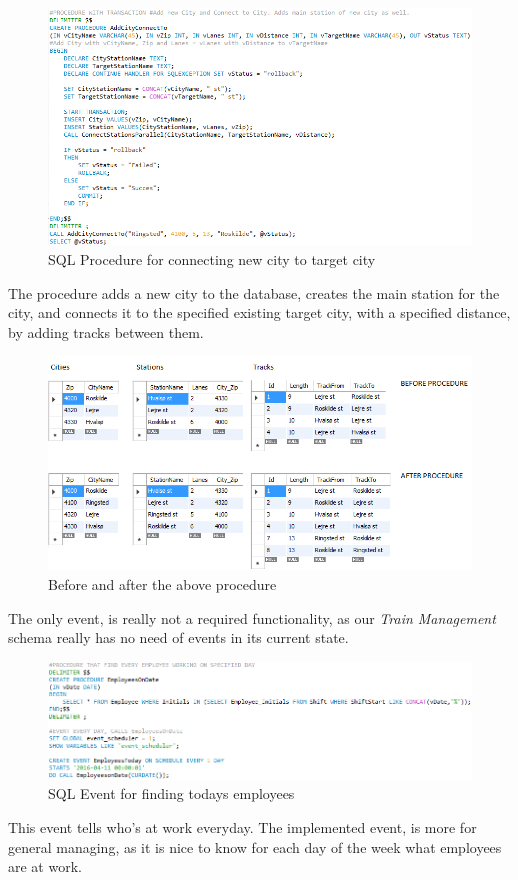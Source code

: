 \begin{figure}[ht!]
    \centering
    \includegraphics[width=1\textwidth]{img/SQL_PROCEDURE_AddCityConnect}
    \caption{SQL Procedure for connecting new city to target city}
    \label{fig:ER}
\end{figure}

The procedure adds a new city to the database, creates the main station for the city, and connects it to the specified existing target city, with a specified distance, by adding tracks between them.

\begin{figure}[ht!]
    \centering
    \includegraphics[width=1\textwidth]{img/SQL_PROCEDURE_AddCityConnect_example}
    \caption{Before and after the above procedure}
    \label{fig:ER}
\end{figure}
\newpage

The only event, is really not a required functionality, as our \emph{Train Management} schema really has no need of events in its current state. 

\begin{figure}[ht!]
    \centering
    \includegraphics[width=1\textwidth]{img/SQL_EVENT}
    \caption{SQL Event for finding todays employees}
    \label{fig:ER}
\end{figure}

This event tells who's at work everyday.
The implemented event, is more for general managing, as it is nice to know for each day of the week what employees are at work.